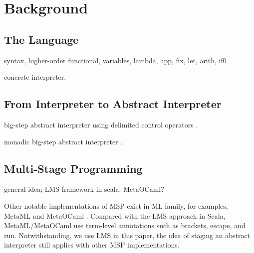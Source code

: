 \section{Background}

\subsection{The Language} \label{bg_lang}

syntax, higher-order functional, variables, lambda, app, fix, let, arith, if0

concrete interpreter.

\subsection{From Interpreter to Abstract Interpreter}

big-step abstract interpreter using delimited control operators \cite{Wei:2018:RAA:3243631.3236800}.

monadic big-step abstract interpreter \cite{DBLP:journals/pacmpl/DaraisLNH17}.

\subsection{Multi-Stage Programming}

general idea; LMS framework in scala. MetaOCaml?

Other notable implementations of MSP exist in ML family, for examples, MetaML \cite{DBLP:conf/pepm/TahaS97} 
and MetaOCaml \cite{DBLP:conf/gpce/CalcagnoTHL03, DBLP:conf/flops/Kiselyov14}.
Compared with the LMS approach in Scala, MetaML/MetaOCaml use term-level annotations such as brackets, 
escape, and run. Notwithstanding, we use LMS in this paper, the idea of staging an abstract interpreter
still applies with other MSP implementations.
